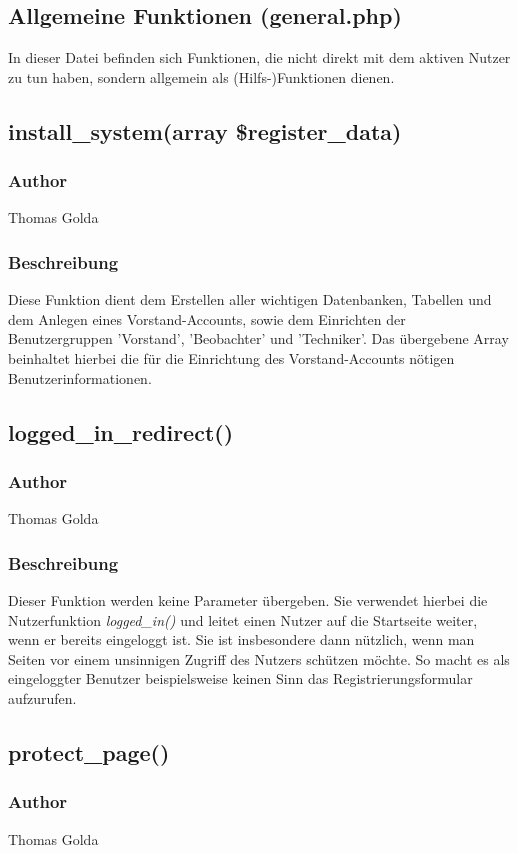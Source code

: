 \documentclass[fontsize = 12pt, paper = a4]{scrreprt}
\begin{document}
\subsection{Allgemeine Funktionen (general.php)}
In dieser Datei befinden sich Funktionen, die nicht direkt mit dem aktiven Nutzer zu tun haben, sondern allgemein als (Hilfs-)Funktionen dienen.
\subsection*{install\_system(array \$register\_data)}
\subsubsection*{Author}
Thomas Golda
\subsubsection*{Beschreibung}
Diese Funktion dient dem Erstellen aller wichtigen Datenbanken, Tabellen und dem Anlegen eines Vorstand-Accounts, sowie dem Einrichten der Benutzergruppen 'Vorstand', 'Beobachter' und 'Techniker'. Das übergebene Array beinhaltet hierbei die für die Einrichtung des Vorstand-Accounts nötigen Benutzerinformationen.


\subsection*{logged\_in\_redirect()}
\subsubsection*{Author}
Thomas Golda
\subsubsection*{Beschreibung}
Dieser Funktion werden keine Parameter übergeben. Sie verwendet hierbei die Nutzerfunktion \textit{logged\_in()} und leitet einen Nutzer auf die Startseite weiter, wenn er bereits eingeloggt ist. Sie ist insbesondere dann nützlich, wenn man Seiten vor einem unsinnigen Zugriff des Nutzers schützen möchte. So macht es als eingeloggter Benutzer beispielsweise keinen Sinn das Registrierungsformular aufzurufen.


\subsection*{protect\_page()}
\subsubsection*{Author}
Thomas Golda
\end{document}
